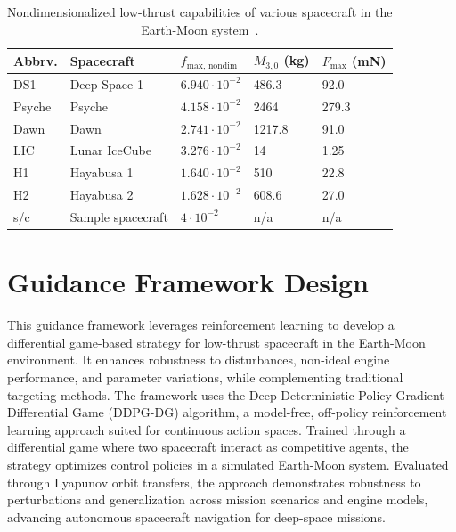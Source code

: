 \documentclass[conference]{IEEEtran}
\begin{document}
\begin{table}[h!]
	\centering
	\caption{Nondimensionalized low-thrust capabilities of various spacecraft in the Earth-Moon system~\cite{lafarge}.}
	\label{tab:camparison}
	\begin{tabular}{|l|l|l|l|l|}
	\hline
	\textbf{Abbrv.} & \textbf{Spacecraft} & \textbf{$f_{\text{max, nondim}}$} & \textbf{$M_{3,0}$ (kg)} & \textbf{$F_{\text{max}}$ (mN)} \\ \hline
	DS1 & Deep Space 1 & $6.940 \cdot 10^{-2}$ & 486.3 & 92.0 \\ \hline
	Psyche & Psyche & $4.158 \cdot 10^{-2}$ & 2464 & 279.3 \\ \hline
	Dawn & Dawn  & $2.741 \cdot 10^{-2}$ & 1217.8 & 91.0 \\ \hline
	LIC & Lunar IceCube & $3.276 \cdot 10^{-2}$ & 14 & 1.25 \\ \hline
	H1 & Hayabusa 1 & $1.640 \cdot 10^{-2}$ & 510 & 22.8 \\ \hline
	H2 & Hayabusa 2 & $1.628 \cdot 10^{-2}$ & 608.6 & 27.0 \\ \hline
	s/c & Sample spacecraft & $4 \cdot 10^{-2}$ & n/a & n/a \\ \hline
	\end{tabular}
\end{table}






\section{Guidance Framework Design}
This guidance framework leverages reinforcement learning to develop a differential game-based strategy for low-thrust spacecraft in the Earth-Moon environment. It enhances robustness to disturbances, non-ideal engine performance, and parameter variations, while complementing traditional targeting methods. The framework uses the Deep Deterministic Policy Gradient Differential Game (DDPG-DG) algorithm, a model-free, off-policy reinforcement learning approach suited for continuous action spaces. Trained through a differential game where two spacecraft interact as competitive agents, the strategy optimizes control policies in a simulated Earth-Moon system. Evaluated through Lyapunov orbit transfers, the approach demonstrates robustness to perturbations and generalization across mission scenarios and engine models, advancing autonomous spacecraft navigation for deep-space missions.
\end{document}
